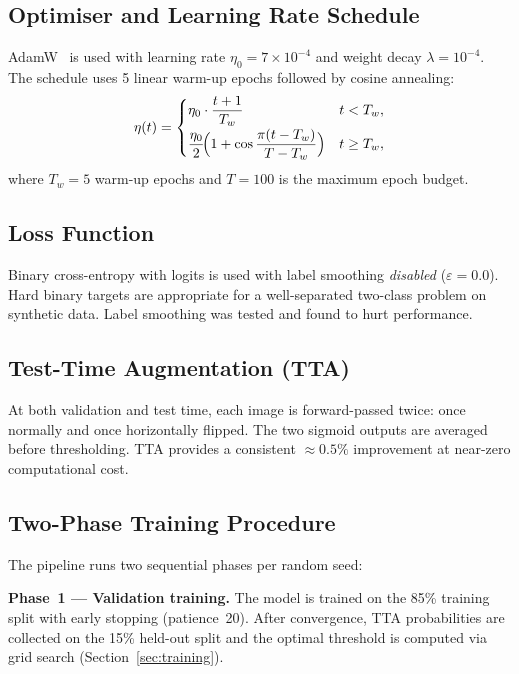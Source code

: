 \documentclass{article}
\theoremstyle{plain}
\theoremstyle{definition}
\theoremstyle{remark}
\begin{document}
\subsection{Optimiser and Learning Rate Schedule}

AdamW~\cite{Loshchilov2019} is used with learning rate
$\eta_0 = 7\!\times\!10^{-4}$ and weight decay $\lambda = 10^{-4}$.
The schedule uses 5 linear warm-up epochs followed by cosine annealing:
\begin{equation}
  \eta(t) = \begin{cases}
    \eta_0 \cdot \dfrac{t+1}{T_w} & t < T_w, \\[6pt]
    \dfrac{\eta_0}{2}\!\Bigl(1 + \cos\dfrac{\pi(t-T_w)}{T - T_w}\Bigr)
      & t \ge T_w,
  \end{cases}
\end{equation}
where $T_w = 5$ warm-up epochs and $T = 100$ is the maximum epoch
budget.

\subsection{Loss Function}

Binary cross-entropy with logits is used with label smoothing
\emph{disabled} ($\varepsilon = 0.0$).  Hard binary targets are
appropriate for a well-separated two-class problem on synthetic data.
Label smoothing was tested and found to hurt performance.

\subsection{Test-Time Augmentation (TTA)}

At both validation and test time, each image is forward-passed twice:
once normally and once horizontally flipped.  The two sigmoid outputs
are averaged before thresholding.  TTA provides a consistent
$\approx 0.5\%$ improvement at near-zero computational cost.

\subsection{Two-Phase Training Procedure}

The pipeline runs two sequential phases per random seed:

\textbf{Phase~1 --- Validation training.}  The model is trained on the
85\% training split with early stopping (patience~20).  After
convergence, TTA probabilities are collected on the 15\% held-out split
and the optimal threshold is computed via grid search
(Section~\ref{sec:training}).
\end{document}
